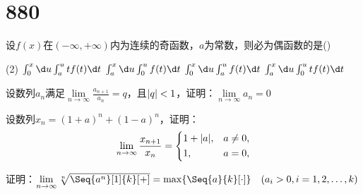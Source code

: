 \section{880}
\begin{question}
设$f(x)$在$(-\infty,+\infty)$内为连续的奇函数，$a$为常数，则必为偶函数的是(\quad)
\begin{tasks}(2)
    \task $\int_{0}^{x} \d u \int_{a}^{u} tf(t) \d t$
    \task $\int_{a}^{x} \d u \int_{0}^{u} f(t) \d t$
    \task $\int_{0}^{x} \d u \int_{a}^{u} f(t) \d t$
    \task $\int_{a}^{x} \d u \int_{0}^{u} tf(t) \d t$
\end{tasks}
\end{question}

\begin{question}
    设数列$ {a_n} $满足$ \lim\limits_{n \to \infty} \frac{a_{n+1}}{a_n} = q $，且$ \lvert q\rvert < 1 $，证明：$ \lim\limits_{n \to \infty} a_n = 0 $
\end{question}

\begin{question}
    设数列$ x_n = (1 + a) ^ n + (1 - a) ^ n $，证明：
    \begin{equation}
        \nonumber
         \lim\limits_{n \to \infty} \frac{x_{n + 1}}{x_n} = \left\{
         \begin{aligned}
            &1 + \lvert a\rvert, & a \neq 0, \\
            &1,           & a = 0,
         \end{aligned}   
         \right.
    \end{equation}
\end{question}

\begin{question}
    证明：$ \lim\limits_{n \to \infty} \sqrt[n]{\Seq{a ^ n}[1]{k}[+]} = \max \{\Seq{a}{k}[\cdot]\} \quad (a_i > 0, i = 1, 2, \dots , k)$
\end{question}